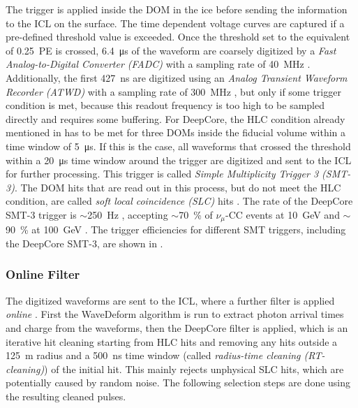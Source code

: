 The trigger is applied inside the DOM in the ice before sending the information to the ICL on the surface. The time dependent voltage curves are captured if a pre-defined threshold value is exceeded. Once the threshold set to the equivalent of \SI{0.25}{PE} is crossed, \SI{6.4}{\micro\second} of the waveform are coarsely digitized by a \textit{Fast Analog-to-Digital Converter (FADC)} with a sampling rate of \SI{40}{\mega\hertz} . Additionally, the first \SI{427}{\nano\second} are digitized using an \textit{Analog Transient Waveform Recorder (ATWD)} with a sampling rate of \SI{300}{\mega\hertz} , but only if some trigger condition is met, because this readout frequency is too high to be sampled directly and requires some buffering. For DeepCore, the HLC condition already mentioned in  has to be met for three DOMs inside the fiducial volume within a time window of \SI{5}{\micro\second}. If this is the case, all waveforms that crossed the threshold within a \SI{20}{\micro\second} time window around the trigger are digitized and sent to the ICL for further processing. This trigger is called \textit{Simple Multiplicity Trigger 3 (SMT-3)}. The DOM hits that are read out in this process, but do not meet the HLC condition, are called \textit{soft local coincidence (SLC)} hits . The rate of the DeepCore SMT-3 trigger is $\sim$\SI{250}{\hertz} , accepting $\sim$\SI{70}{\percent} of $\nu_\mu$-CC events at \SI{10}{\giga\electronvolt} and $\sim$\SI{90}{\percent} at \SI{100}{\giga\electronvolt} . The trigger efficiencies for different SMT triggers, including the DeepCore SMT-3, are shown in .


\subsubsection{Online Filter} 

The digitized waveforms are sent to the ICL, where a further filter is applied \textit{online} . First the WaveDeform algorithm is run to extract photon arrival times and charge from the waveforms, then the DeepCore filter is applied, which is an iterative hit cleaning starting from HLC hits and removing any hits outside a \SI{125}{\meter} radius and a \SI{500}{\nano\second} time window (called \textit{radius-time cleaning (RT-cleaning)}) of the initial hit. This mainly rejects unphysical SLC hits, which are potentially caused by random noise. The following selection steps are done using the resulting cleaned pulses.

